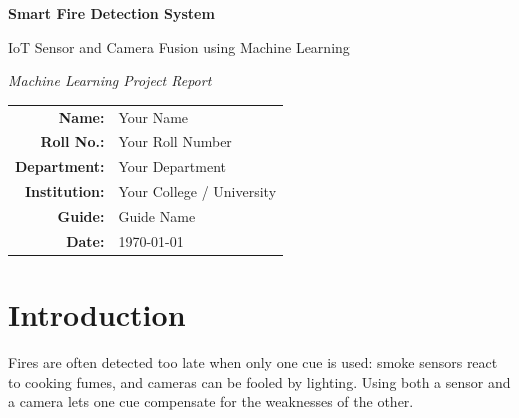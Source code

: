 \documentclass[12pt,a4paper]{article}
\begin{document}
\begin{titlepage}
\centering
\vspace*{2cm}
{\Huge\bfseries Smart Fire Detection System\par}
\vspace{0.6cm}
{\Large IoT Sensor and Camera Fusion using Machine Learning\par}
\vspace{1.5cm}
{\large\itshape Machine Learning Project Report\par}
\vspace{3cm}
\begin{tabular}{rl}
\textbf{Name:}        & Your Name \\[4pt]
\textbf{Roll No.:}    & Your Roll Number \\[4pt]
\textbf{Department:}  & Your Department \\[4pt]
\textbf{Institution:} & Your College / University \\[4pt]
\textbf{Guide:}       & Guide Name \\[4pt]
\textbf{Date:}        & \today
\end{tabular}
\vfill
\end{titlepage}

\begin{abstract}
This project builds an early-warning fire detection system that combines two independent sources of evidence: an ESP8266 sensor node (MQ-2 smoke, temperature and humidity) analysed by a Random Forest classifier, and a camera analysed by a YOLO object detector. The two probabilities are merged by weighted late fusion into three alert levels (SAFE, WARNING, ALERT) and displayed live on a React dashboard served by a FastAPI backend. The sensor model was trained on 6{,}633 cleaned readings collected from the hardware. This report describes the data, the machine learning pipeline, the system architecture, the evaluation and the limitations of the work.
\end{abstract}

\tableofcontents
\listoffigures
\listoftables
\newpage

\section{Introduction}
Fires are often detected too late when only one cue is used: smoke sensors react to cooking fumes, and cameras can be fooled by lighting. Using both a sensor and a camera lets one cue compensate for the weaknesses of the other.
\end{document}
